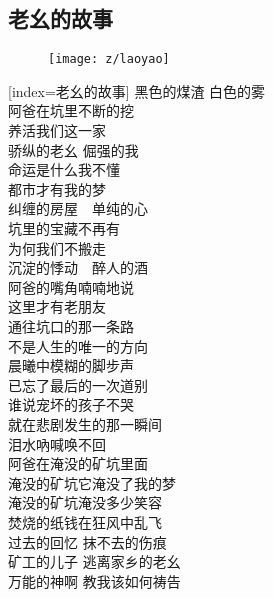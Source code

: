 \subsection{老幺的故事}

\begin{figure}[htp]
	\begin{center}
	  \texttt{[image: z/laoyao]}
	  \label{fig:laoyao}
	\end{center}
\end{figure}

\begin{songs}{}
  [index={老幺的故事}]
	黑色的煤渣 \hspace{5 mm} 白色的雾	\\
	阿爸在坑里不断的挖	\\
	养活我们这一家	\\
	骄纵的老幺 \hspace{5 mm} 倔强的我	\\
	命运是什么我不懂	\\
	都市才有我的梦	\\
	\vspace{2ex}
	纠缠的房屋　单纯的心	\\
	坑里的宝藏不再有	\\
	为何我们不搬走	\\
	沉淀的悸动　醉人的酒	\\
	阿爸的嘴角喃喃地说	\\
	这里才有老朋友	\\
	\vspace{2ex}
	通往坑口的那一条路	\\
	不是人生的唯一的方向	\\
	晨曦中模糊的脚步声	\\
	已忘了最后的一次道别	\\
	谁说宠坏的孩子不哭	\\
	就在悲剧发生的那一瞬间	\\
	泪水吶喊唤不回	\\
	阿爸在淹没的矿坑里面	\\
	\vspace{2ex}
	淹没的矿坑它淹没了我的梦	\\
	淹没的矿坑淹没多少笑容	\\
	焚烧的纸钱在狂风中乱飞	\\
	过去的回忆 抹不去的伤痕	\\
	矿工的儿子 逃离家乡的老幺	\\	
	万能的神啊 教我该如何祷告	\\	

\end{songs}
